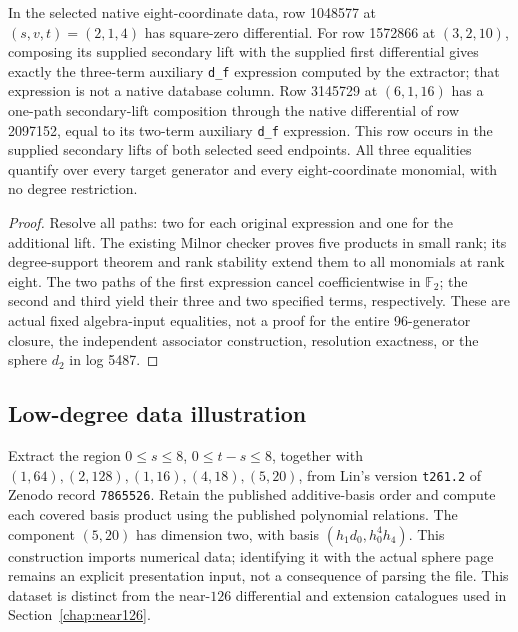 \begin{proposition}
  \label{prop:lin-secondary-5487-selected-equalities}
  \leanok
  In the selected native eight-coordinate data, row 1048577 at
  $(s,v,t)=(2,1,4)$ has square-zero differential. For row 1572866 at
  $(3,2,10)$, composing its supplied secondary lift with the supplied first
  differential gives exactly the three-term auxiliary \texttt{d\_f} expression
  computed by the extractor; that expression is not a native database column.
  Row 3145729 at $(6,1,16)$ has a one-path secondary-lift composition
  through the native differential of row 2097152, equal to its two-term
  auxiliary \texttt{d\_f} expression. This row occurs in the supplied
  secondary lifts of both selected seed endpoints.
  All three equalities quantify over every target generator and every
  eight-coordinate monomial, with no degree restriction.
\end{proposition}
\begin{proof}
  \leanok
  Resolve all paths: two for each original expression and one for the
  additional lift. The existing Milnor checker proves five products in
  small rank; its degree-support
  theorem and rank stability extend them to all monomials at rank eight.
  The two paths of the first expression cancel coefficientwise in
  $\mathbb F_2$; the second and third yield their three and two specified
  terms, respectively.
  These are actual fixed algebra-input equalities, not a proof for the
  entire 96-generator closure, the independent associator construction,
  resolution exactness, or the sphere $d_2$ in log 5487.
\end{proof}

\subsection{Low-degree data illustration}

\begin{definition}
  \label{def:lin-low-degree-table}
  Extract the region $0\le s\le8$, $0\le t-s\le8$, together with
  $(1,64),(2,128),(1,16),(4,18),(5,20)$, from Lin's version
  \texttt{t261.2} of Zenodo record \texttt{7865526}.
  Retain the published additive-basis order and compute each covered basis
  product using the published polynomial relations.
  The component $(5,20)$ has dimension two, with basis
  $(h_1d_0,h_0^4h_4)$.
  This construction imports numerical data; identifying it with the actual
  sphere page remains an explicit presentation input, not a consequence of
  parsing the file. This dataset is distinct from the near-$126$
  differential and extension catalogues used in Section~\ref{chap:near126}.
\end{definition}

